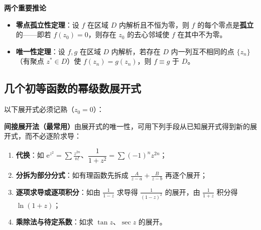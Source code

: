 \textbf{两个重要推论}
\begin{itemize}[leftmargin=2em]
  \item \textbf{零点孤立性定理}：设 \(f\) 在区域 \(D\) 内解析且不恒为零，则 \(f\) 的每个零点是\textbf{孤立}的——即若 \(f(z_{0})=0\)，则存在 \(z_{0}\) 的去心邻域使 \(f\) 在其中不为零。
  \item \textbf{唯一性定理}：设 \(f,g\) 在区域 \(D\) 内解析，若存在 \(D\) 内一列互不相同的点 \(\{z_{n}\}\)（有聚点 \(z^{*}\in D\)）使 \(f(z_{n})=g(z_{n})\)，则 \(f\equiv g\) 于 \(D\)。
\end{itemize}

\subsection{几个初等函数的幂级数展开式}
以下展开式必须记熟（\(z_{0}=0\)）：

\textbf{间接展开法（最常用）}\quad 由展开式的唯一性，可用下列手段从已知展开式得到新的展开式，而不必逐阶求导：
\begin{enumerate}[leftmargin=2em]
  \item \textbf{代换}：如 \(\mathrm{e}^{z^{2}}=\sum\frac{z^{2n}}{n!}\)、\(\dfrac{1}{1+z^{2}}=\sum(-1)^{n}z^{2n}\)；
  \item \textbf{分拆为部分分式}：如有理函数先拆成 \(\frac{A}{z-a}+\frac{B}{z-b}\) 再逐个展开；
  \item \textbf{逐项求导或逐项积分}：如由 \(\frac{1}{1-z}\) 求导得 \(\frac{1}{(1-z)^{2}}\) 的展开，由 \(\frac{1}{1+z}\) 积分得 \(\ln(1+z)\)；
  \item \textbf{乘除法与待定系数}：如求 \(\tan z\)、\(\sec z\) 的展开。
\end{enumerate}


